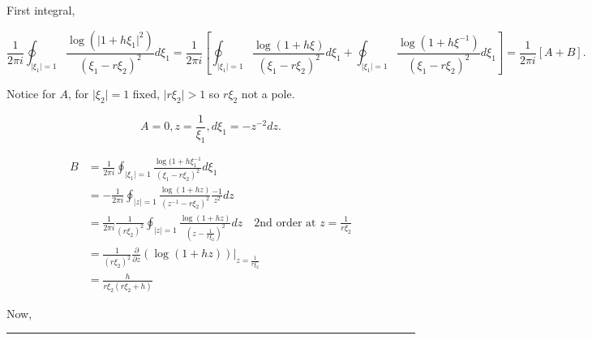 \documentclass[twoside]{article}
\newenvironment{proof}{{\bf Proof:}}{\hfill\rule{2mm}{2mm}}
\begin{document}
\begin{proof}
	First integral,
	
	$$\frac{1}{2\pi i}\oint_{\lvert\xi_1\rvert=1}\frac{\log(\lvert 1+h\xi_1\rvert^2)}{(\xi_1-r\xi_2)^2}d\xi_1=\frac{1}{2\pi i}\left[\oint_{\lvert\xi_1\rvert=1}\frac{\log(1+h\xi)}{(\xi_1-r\xi_2)^2}d\xi_1+\oint_{\lvert\xi_1\rvert=1}\frac{\log(1+h\xi^{-1})}{(\xi_1-r\xi_2)^2}d\xi_1\right]=\frac{1}{2\pi i}[A+B].$$
	
	Notice for $A$, for $\lvert \xi_2\rvert =1$ fixed, $\lvert r\xi_2\rvert>1$ so $r\xi_2$ not a pole.
	
	$$A=0, z=\frac{1}{\xi_1}, d\xi_1=-z^{-2}dz.$$
	
	\begin{equation}
		\begin{split}
			B&=\frac{1}{2\pi i}\oint_{\lvert\xi_1\rvert=1}\frac{\log(1+h\xi_1^{-1}}{(\xi_1-r\xi_2)^2}d\xi_1\\
			&=-\frac{1}{2\pi i}\oint_{\lvert z\rvert=1}\frac{\log(1+hz)}{(z^{-1}-r\xi_2)^2}\frac{-1}{z^2}dz\\
			&=\frac{1}{2\pi i}\frac{1}{(r\xi_2)^2}\oint_{\lvert z\rvert=1}\frac{\log(1+hz)}{(z-\frac{1}{r\xi_2})^2}dz\ \ \ \text{ 2nd order at $z=\frac{1}{r\xi_2}$}\\ 
			&=\frac{1}{(r\xi_2)^2}\frac{\partial}{\partial z}(\log(1+hz))\Bigg\lvert_{z=\frac{1}{r\xi_2}}\\
			&=\frac{h}{r\xi_2(r\xi_2+h)}
		\end{split}
	\end{equation}
	
	Now,
	

\end{proof}
\end{document}

